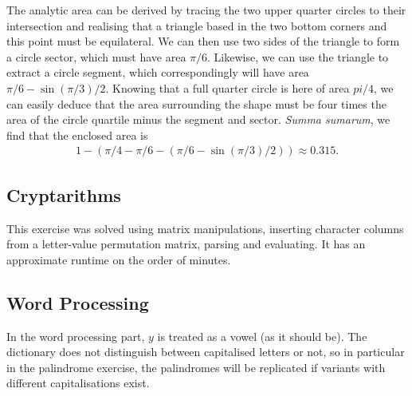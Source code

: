 \documentclass[12pt]{article}\usepackage[]{graphicx}\usepackage[]{color}
\theoremstyle{plain}
\theoremstyle{definition}
\begin{document}
The analytic area can be derived by tracing the two upper quarter circles to their intersection and realising that a triangle based in the two bottom corners and this point must be equilateral. We can then use two sides of the triangle to form a circle sector, which must have area $\pi/6$. Likewise, we can use the triangle to extract a circle segment, which correspondingly will have area $\pi/6 - \sin(\pi/3)/2$. Knowing that a full quarter circle is here of area $pi/4$, we can easily deduce that the area surrounding the shape must be four times the area of the circle quartile minus the segment and sector. \textit{Summa sumarum}, we find that the enclosed area is
\begin{align*}
  1 - (\pi/4 - \pi/6 - (\pi/6 - \sin(\pi/3)/2)) \approx 0.315\text{.}
\end{align*}
\begin{center}
  
\end{center}
\subsection{Cryptarithms}
This exercise was solved using matrix manipulations, inserting character columns from a letter-value permutation matrix, parsing and evaluating. It has an approximate runtime on the order of minutes.


\subsection{Word Processing}
In the word processing part, $y$ is treated as a vowel (as it should be). The dictionary does not distinguish between capitalised letters or not, so in particular in the palindrome exercise, the palindromes will be replicated if variants with different capitalisations exist. 
\begin{center}
  
  
  
\end{center}
\end{document}
